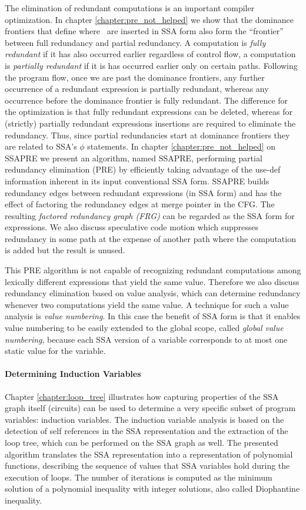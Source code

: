 The elimination of redundant computations is an important compiler
optimization. In chapter \ref{chapter:pre_not_helped} we show that the
dominance frontiers that define where \phifuns\ are inserted
in SSA form also form the ``frontier'' between full redundancy and
partial redundancy. A computation is {\em fully redundant} if it has
also occurred earlier regardless of control flow, a computation is {\em
  partially redundant} if it is has occurred earlier only on certain
paths. Following the program flow, once we are past the dominance
frontiers, any further occurrence of a redundant expression is
partially redundant, whereas any occurrence before the dominance
frontier is fully redundant. The difference for the optimization is
that fully redundant expressions can be deleted, whereas for
(strictly) partially redundant expressions insertions are required to
eliminate the redundancy. Thus, since partial redundancies start at
dominance frontiers they are related to SSA's $\phi$ statements. In
chapter \ref{chapter:pre_not_helped} on SSAPRE we present an
algorithm, named SSAPRE, performing partial redundancy elimination
(PRE) by efficiently taking advantage of the use-def information
inherent in its input conventional SSA form. SSAPRE builds redundancy
edges between redundant expressions (in SSA form) and has the effect
of factoring the redundancy edges at merge pointer in the CFG. The
resulting {\em factored redundancy graph (FRG)} can be regarded as the
SSA form for expressions. We also discuss speculative code motion
which suppresses redundancy in some path at the expense of another
path where the computation is added but the result is unused.

This PRE algorithm is not capable of recognizing redundant
computations among lexically different expressions that yield the same
value. Therefore we also discuss redundancy elimination based on value
analysis, which can determine redundancy whenever two computations
yield the same value. A technique for such a value analysis is {\em
  value numbering}. In this case the benefit of SSA form is that it
enables value numbering to be easily extended to the global scope,
called {\em global value numbering}, because each SSA version of a
variable corresponds to at most one static value for the variable.

\paragraph{Determining Induction Variables}

Chapter \ref{chapter:loop_tree} illustrates how capturing properties
of the SSA graph itself (circuits) can be used to determine a very
specific subset of program variables: induction variables. The
induction variable analysis is based on the detection of self
references in the SSA representation and the extraction of the loop
tree, which can be performed on the SSA graph as well. The presented algorithm
translates the SSA representation into a representation of polynomial
functions, describing the sequence of values that SSA variables hold
during the execution of loops. The number of iterations is computed as
the minimum solution of a polynomial inequality with integer
solutions, also called Diophantine inequality.
